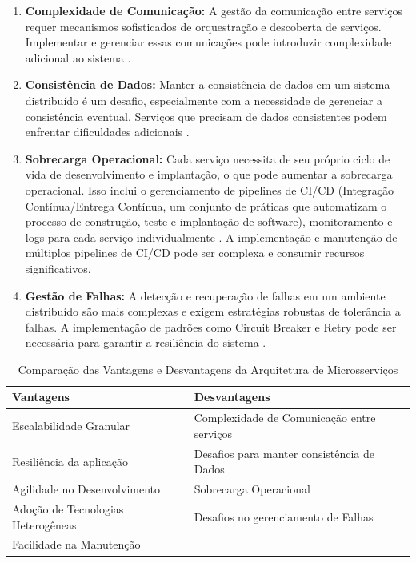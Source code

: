 \begin{enumerate}
    \item \textbf{Complexidade de Comunicação:} A gestão da comunicação entre serviços requer mecanismos sofisticados de orquestração e descoberta de serviços. Implementar e gerenciar essas comunicações pode introduzir complexidade adicional ao sistema \cite{dragoni2017}.
    \item \textbf{Consistência de Dados:} Manter a consistência de dados em um sistema distribuído é um desafio, especialmente com a necessidade de gerenciar a consistência eventual. Serviços que precisam de dados consistentes podem enfrentar dificuldades adicionais \cite{richardson2018}.
    \item \textbf{Sobrecarga Operacional:} Cada serviço necessita de seu próprio ciclo de vida de desenvolvimento e implantação, o que pode aumentar a sobrecarga operacional. Isso inclui o gerenciamento de pipelines de CI/CD (Integração Contínua/Entrega Contínua, um conjunto de práticas que automatizam o processo de construção, teste e implantação de software), monitoramento e logs para cada serviço individualmente \cite{fowler2014}. A implementação e manutenção de múltiplos pipelines de CI/CD pode ser complexa e consumir recursos significativos.
    \item \textbf{Gestão de Falhas:} A detecção e recuperação de falhas em um ambiente distribuído são mais complexas e exigem estratégias robustas de tolerância a falhas. A implementação de padrões como Circuit Breaker e Retry pode ser necessária para garantir a resiliência do sistema \cite{newman2019}.
\end{enumerate}

\begin{table}[h]
\centering
\caption{Comparação das Vantagens e Desvantagens da Arquitetura de Microsserviços}
\begin{tabular}{|p{5cm}|p{5cm}|}
\hline
\textbf{Vantagens} & \textbf{Desvantagens} \\ \hline
Escalabilidade Granular & Complexidade de Comunicação entre serviços \\ \hline
Resiliência da aplicação & Desafios para manter consistência de Dados \\ \hline
Agilidade no Desenvolvimento & Sobrecarga Operacional \\ \hline
Adoção de Tecnologias Heterogêneas & Desafios no gerenciamento de Falhas \\ \hline
Facilidade na Manutenção & \\ \hline
\end{tabular}
\label{tab:vantagens_desvantagens}
\end{table}



